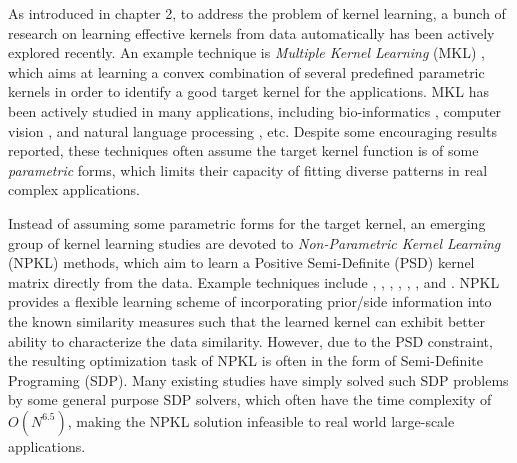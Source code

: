 %

As introduced in chapter 2, to address the problem of kernel learning, a bunch of research on learning effective kernels from data automatically has been actively explored recently. An example technique is
\emph{Multiple Kernel Learning} (MKL) \cite{jmlr/LanckrietCBGJ03,icml/BachLJ04}, which aims at learning a convex combination of several predefined parametric kernels in order to identify a good target kernel for the applications. MKL has been actively studied in many
applications, including bio-informatics \cite{nips/SonnenburgRS05,jmlr/SonnenburgRSS06}, computer vision \cite{cvpr/DuanTXM09,cvpr/SunWYCCL09,iccv/VedaldiGVZ09}, and natural language processing \cite{corr/MaoT11}, etc. Despite some encouraging results reported, these techniques often assume the target kernel function is of some {\it parametric} forms, which limits their capacity of fitting diverse patterns in real complex applications.

Instead of assuming some parametric forms for the target kernel, an emerging group of kernel learning studies are devoted to \emph{Non-Parametric Kernel Learning} (NPKL) methods, which aim to learn a Positive Semi-Definite (PSD) kernel matrix directly from the data. Example techniques include \cite{nips/CristianiniSEK01}, \cite{jmlr/LanckrietCBGJ03}, \cite{nips/ZhuKGL04}, \cite{nips/ZhangA05}, \cite{icml/KulisSD06}, \cite{icml/HoiJL07}, \cite{jmlr/KulisSD09} and \cite{aistats/LiFDSW09,uai/MaoT10}. NPKL provides a flexible learning scheme of incorporating prior/side information into the known similarity measures such that the learned kernel can exhibit better ability to characterize the data similarity. However, due to the PSD constraint, the resulting
optimization task of NPKL is often in the form of Semi-Definite Programing (SDP). Many existing studies have simply solved such SDP problems by some general purpose SDP solvers, which often have the time complexity of $O(N^{6.5})$, making the NPKL solution infeasible to real world large-scale applications.

